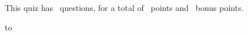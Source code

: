 \documentclass[11pt,answers]{exam}
\begin{document}
\extrawidth{-0.3in}
\pagestyle{headandfoot}

\setlength{\hoffset}{-.25in}

\extraheadheight{-.3in}
\runningheadrule
{} 

\begin{center}
	This quiz has \numquestions\ questions, for a total of \numpoints\
	points and \numbonuspoints\ bonus points.
\end{center}


\firstpagefooter{} %
                {}
                {%
                }
                 
						

\vspace*{0.1cm}
\hbox to 
\vspace{0.1in}




\end{document}
